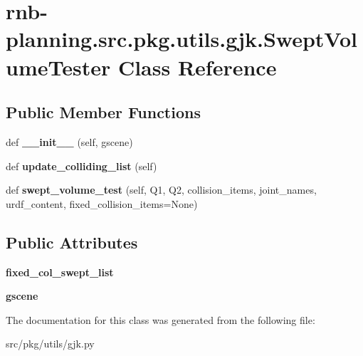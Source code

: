 \hypertarget{classrnb-planning_1_1src_1_1pkg_1_1utils_1_1gjk_1_1_swept_volume_tester}{}\section{rnb-\/planning.src.\+pkg.\+utils.\+gjk.\+Swept\+Volume\+Tester Class Reference}
\label{classrnb-planning_1_1src_1_1pkg_1_1utils_1_1gjk_1_1_swept_volume_tester}
\subsection*{Public Member Functions}
\begin{DoxyCompactItemize}
\item 
\mbox{\label{classrnb-planning_1_1src_1_1pkg_1_1utils_1_1gjk_1_1_swept_volume_tester_a6bcd39308ffeb36252c4067e192904e7}} 
def {\bfseries \+\_\+\+\_\+init\+\_\+\+\_\+} (self, gscene)
\item 
\mbox{\label{classrnb-planning_1_1src_1_1pkg_1_1utils_1_1gjk_1_1_swept_volume_tester_a9520fd8aa5183f2dc9afa0b8346349de}} 
def {\bfseries update\+\_\+colliding\+\_\+list} (self)
\item 
\mbox{\label{classrnb-planning_1_1src_1_1pkg_1_1utils_1_1gjk_1_1_swept_volume_tester_a3005e61846042c64531238e2b8476693}} 
def {\bfseries swept\+\_\+volume\+\_\+test} (self, Q1, Q2, collision\+\_\+items, joint\+\_\+names, urdf\+\_\+content, fixed\+\_\+collision\+\_\+items=None)
\end{DoxyCompactItemize}
\subsection*{Public Attributes}
\begin{DoxyCompactItemize}
\item 
\mbox{\label{classrnb-planning_1_1src_1_1pkg_1_1utils_1_1gjk_1_1_swept_volume_tester_a99333f9afc714ad6f7aecd1680269b8c}} 
{\bfseries fixed\+\_\+col\+\_\+swept\+\_\+list}
\item 
\mbox{\label{classrnb-planning_1_1src_1_1pkg_1_1utils_1_1gjk_1_1_swept_volume_tester_acb2387ea98d02eb1bb502fa585cbeb01}} 
{\bfseries gscene}
\end{DoxyCompactItemize}


The documentation for this class was generated from the following file\+:\begin{DoxyCompactItemize}
\item 
src/pkg/utils/gjk.\+py\end{DoxyCompactItemize}

